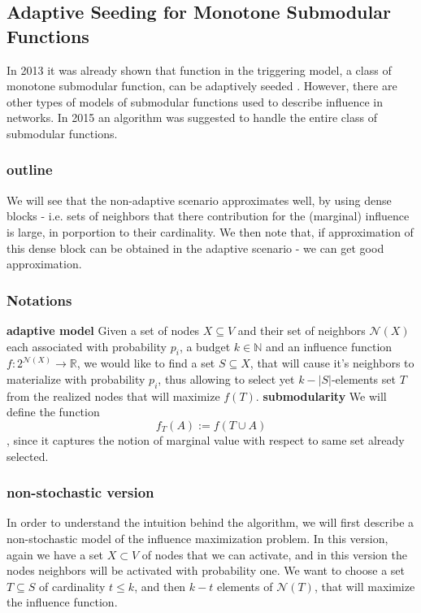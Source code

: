 \subsection{Adaptive Seeding for Monotone Submodular Functions}\label{sec:sub}
In 2013 it was already shown that function in the triggering model, a class of monotone submodular function, can be adaptively seeded \cite{seeman2013adaptive}. However, there are other types of models of submodular functions used to describe influence in networks. In 2015 \cite{badanidiyuru2016locally} an algorithm was suggested to handle the entire class of submodular functions.

\subsubsection{outline}
We will see that the non-adaptive scenario approximates well, by using dense blocks - i.e. sets of neighbors that there contribution for the (marginal) influence is large, in porportion to their cardinality. We then note that, if approximation of this dense block can be obtained in the adaptive scenario - we can get good approximation. 	

\subsubsection{Notations}
\textbf{adaptive model} Given a set of nodes $X\subseteq V$ and their set of neighbors 
$\mathcal{N}(X)$ each associated with probability $p_i$, a budget $k\in\mathbb{N}$ and an influence function $f:2^{\mathcal{N}(X)}\rightarrow \mathbb{R}$, we would like to find a set $S\subseteq X$, that will cause it's neighbors to materialize with probability $p_i$, thus allowing to select yet $k-|S|$-elements set $T$ from the realized nodes that will maximize $f(T)$.
\textbf{submodularity}
We will define the function $$f_T(A):=f(T\cup A)$$, since it captures the notion of marginal value with respect to same set already selected.
 
\subsubsection{non-stochastic version}
In order to understand the intuition behind the algorithm, we will first describe a non-stochastic model of the influence maximization problem. In this version, again we have a set $X\subset V$ of nodes that we can activate, and in this version the nodes neighbors will be activated with probability one. We want to choose a set $T\subseteq S$ of cardinality $t\le k$, and then $k-t$ elements of $\mathcal{N}(T)$, that will maximize the influence function. 

